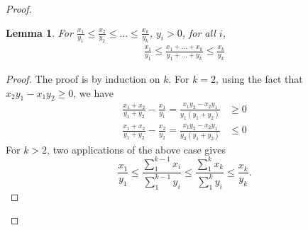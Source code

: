 \documentclass{article}
\newtheorem{lemma}{Lemma}
\theoremstyle{case}
\begin{document}
\begin{proof}
\begin{lemma}
For $\frac{x_1}{y_1} \leq \frac{x_2}{y_2} \leq \dots \leq \frac{x_k}{y_k}$, $y_i > 0$, for all $i$,
\begin{align*}
\frac{x_1}{y_1} \leq \frac{x_1 + \dots + x_k}{y_1 + \dots + y_k} \leq \frac{x_k}{y_k}
\end{align*}
\end{lemma}
\begin{proof}
The proof is by induction on $k$. For $k=2$, using the fact that $x_2y_1 - x_1y_2 \geq 0$, we have
\begin{align*}
\frac{x_1+x_2}{y_1+y_2} - \frac{x_1}{y_1} = \frac{x_1y_2 - x_2y_1}{y_1\left( y_1 + y_2\right)} &\geq 0 \\
\frac{x_1 + x_2}{y_1 + y_2} - \frac{x_2}{y_2} = \frac{x_1y_2 - x_2y_1}{y_2\left( y_1 + y_2\right)} &\leq 0
\end{align*}
For $k > 2$, two applications of the above case gives
\[
\frac{x_1}{y_1} \leq \frac{\sum_1^{k-1} x_i}{\sum_1^{k-1} y_i} \leq \frac{\sum_1^k x_k}{\sum_1^k y_i} \leq \frac{x_k}{y_k}. 
\]
\end{proof}


\end{proof}
\end{document}
